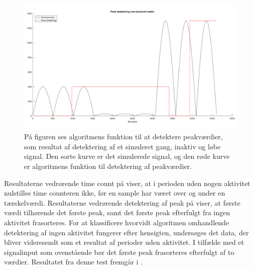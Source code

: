 \begin{figure}[H]
	\centering
	\includegraphics[scale=0.3]{figures/cDesign/test_peak_inaktiv.png}
	\caption{På figuren ses algoritmens funktion til at detektere peakværdier, som resultat af detektering af et simuleret gang, inaktiv og løbe signal. Den sorte kurve er det simulerede signal, og den røde kurve er algoritmens funktion til detektering af peakværdier. }
	\label{fig:test_inaktiv_peak}
\end{figure}
Resultaterne vedrørende time count på  viser, at i perioden uden nogen aktivitet nulstilles time counteren ikke, før en sample har været over og under en tærskelværdi. Resultaterne vedrørende detektering af peak på  viser, at første værdi tilhørende det første peak, samt det første peak efterfulgt fra ingen aktivitet frasorteres. For at klassificere hvorvidt algoritmen omhandlende detektering af ingen aktivitet fungerer efter hensigten, undersøges det data, der bliver videresendt som et resultat af perioder uden aktivitet. I tilfælde med et signalinput som ovenstående bør det første peak frasorteres efterfulgt af to værdier. Resultatet fra denne test fremgår i . %
